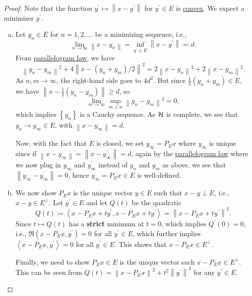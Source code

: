 \begin{proof}
	Note that the function \(y^\prime \mapsto \left\lVert x - y^\prime \right\rVert \) for \(y^\prime \in E\) is \hyperref[def:convex-function]{convex}. We expect a minimizer \(y^\prime \).
	\begin{enumerate}[(a)]
		\item Let \(y_n\in E\) for \(n = 1, 2, \ldots  \) be a minimizing sequence, i.e.,
		      \[
			      \lim\limits_{n \to \infty} \left\lVert x - y_n\right\rVert = \inf _{y^\prime \in E}\left\lVert x - y^\prime \right\rVert \eqqcolon d.
		      \]
		      From \hyperref[lma:parallelogram-law]{parallelogram law}, we have
		      \[
			      \left\lVert y_{n} - y_{m} \right\rVert^{2} + 4 \left\lVert x - (y_{n} + y_{m} ) / 2\right\rVert ^{2} = 2\left\lVert x - y_{n} \right\rVert ^{2} + 2\left\lVert x- y_{m} \right\rVert ^{2}.
		      \]
		      As \(n, m\to \infty \), the right-hand side goes to \(4d^{2} \). But since \(\frac{1}{2}(y_{n} + y_{m} )\in E\), we have \(\left\lVert x - \frac{1}{2}(y_{n} - y_{m} )\right\rVert \geq d\), so
		      \[
			      \lim\limits_{m \to \infty} \sup _{m \geq n}\left\lVert y_{n} - y_{m} \right\rVert^{2} = 0,
		      \]
		      which implies \(\left\{ y_{n}  \right\} \) is a Cauchy sequence. As \(\mathcal{\MakeUppercase{h}} \) is complete, we see that \(y_{n} \to y_{\infty }\in E\), with \(\left\lVert x - y_{\infty }\right\rVert=d \).

		      Now, with the fact that \(E\) is closed, we set \(y_\infty = P_E x\) where \(y_\infty \) is unique since if \(\left\lVert x - y_\infty \right\rVert = \left\lVert x - y^\prime _\infty \right\rVert = d \), again by the \hyperref[lma:parallelogram-law]{parallelogram law} where we now plug in \(y_\infty \) and \(y_\infty ^\prime \) instead of \(y_{n} \) and \(y_{m} \) as above, we see that \(\left\lVert y_\infty - y^\prime _\infty \right\rVert = 0\), hence \(y_\infty = P_E x \in E\) is well-defined.

		\item We now show \(P_E x\) is the unique vector \(y\in E\) such that \(x - y\perp E\), i.e., \(x-y\in E^\perp\). Let \(y^\prime \in E\) and let \(Q(t)\) be the quadratic
		      \[
			      Q(t)\coloneqq \left\langle x-P_E x + ty^\prime , x - P_E x + ty^\prime  \right\rangle = \left\lVert x - P_E x + ty^\prime \right\rVert ^{2}.
		      \]
		      Since \(t\mapsto Q(t)\) has a \textbf{strict} minimum at \(t = 0\), which implies \(Q^\prime (0) = 0\), i.e., \(\Re \left( x-P_E x, y^\prime  \right) = 0\) for all \(y^\prime \in E\), which further implies \(\left\langle x-P_E x, y^\prime  \right\rangle= 0\) for all \(y^\prime \in E\). This shows that \(x - P_E x\in E^{\perp}\).

		      Finally, we need to show \(P_E x\in E\) is the unique vector such \(x - P_E x\in E^\perp\). This can be seen from \(Q(t)=\left\lVert x - P_E x\right\rVert^{2} + t^{2} \left\lVert y^\prime \right\rVert^{2}\) for any \(y^\prime \in E\).
	\end{enumerate}
\end{proof}

